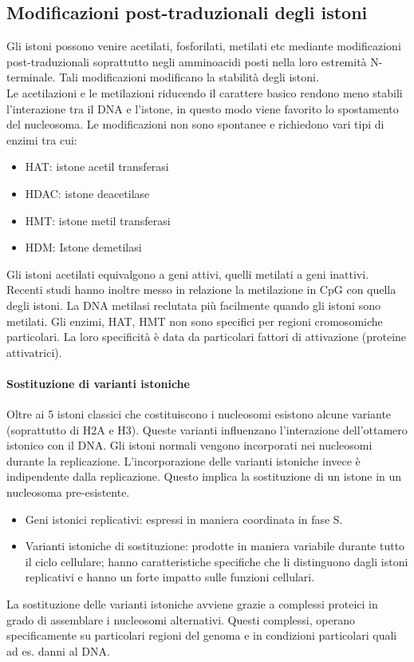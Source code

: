 \documentclass{article}
\begin{document}
\subsection{Modificazioni post-traduzionali degli istoni}
Gli istoni possono venire acetilati, fosforilati, metilati etc mediante
modificazioni post-traduzionali soprattutto negli amminoacidi posti nella loro
estremità N-terminale. Tali modificazioni modificano la stabilità degli istoni.\\
Le acetilazioni e le metilazioni riducendo il carattere basico rendono meno
stabili l'interazione tra il DNA e l'istone, in questo modo viene favorito lo
spostamento del nucleosoma. Le modificazioni non sono spontanee e richiedono vari tipi di enzimi tra cui:
\begin{itemize}
    \item HAT: istone acetil transferasi
    \item HDAC: istone deacetilase
    \item HMT: istone metil transferasi
    \item HDM: Istone demetilasi
\end{itemize}
Gli istoni acetilati equivalgono a geni attivi, quelli metilati a geni inattivi.\\
Recenti studi hanno inoltre messo in relazione la metilazione in
CpG con quella degli istoni. La DNA metilasi reclutata più facilmente quando gli istoni sono
metilati. Gli enzimi, HAT, HMT non sono specifici per regioni cromosomiche particolari.
La loro specificità è data da particolari fattori di attivazione (proteine attivatrici).
\paragraph{Sostituzione di varianti istoniche}
Oltre ai 5 istoni classici che costituiscono i nucleosomi esistono
alcune variante (soprattutto di H2A e H3). Queste varianti
influenzano l'interazione dell'ottamero istonico con il DNA. Gli istoni normali vengono incorporati nei nucleosomi durante la
replicazione. L'incorporazione delle varianti istoniche invece è indipendente
dalla replicazione. Questo implica la sostituzione di un istone in un
nucleosoma pre-esistente. 
\begin{itemize}
    \item Geni istonici replicativi: espressi in maniera coordinata in fase S.
    \item Varianti istoniche di sostituzione: prodotte in maniera variabile durante tutto il ciclo cellulare; hanno caratteristiche 
    specifiche che li distinguono dagli istoni replicativi e hanno un forte impatto sulle funzioni cellulari.
\end{itemize}
La sostituzione delle varianti istoniche avviene grazie a
complessi proteici in grado di assemblare i nucleosomi
alternativi. Questi complessi, operano specificamente su particolari
regioni del genoma e in condizioni particolari quali ad es.
danni al DNA. 
\end{document}
